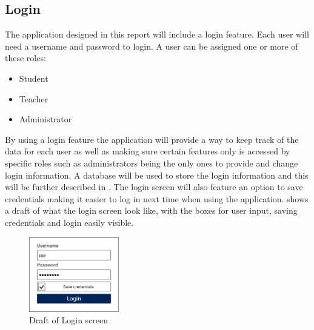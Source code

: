 \clearpage
\subsection{Login}
The application designed in this report will include a login feature. Each user will need a username and password to login.
A user can be assigned one or more of these roles:

\begin{itemize}
    \item Student
    \item Teacher
    \item Administrator
\end{itemize}

\noindent
By using a login feature the application will provide a way to keep track of the data for each user as well as making sure certain features only is accessed by specific roles such as administrators being the only ones to provide and change login information. A database will be used to store the login information and this will be further described in .
\newline\newline
The login screen will also feature an option to save credentials making it easier to log in next time when using the application.
 shows a draft of what the login screen look like, with the boxes for user input, saving credentials and login easily visible.

\begin{figure}[H]
    \centering
    \includegraphics[width=0.35\textwidth]{figures/LoginDraft.png}
    \caption{Draft of Login screen}
    \label{fig:login_draft}
\end{figure}
